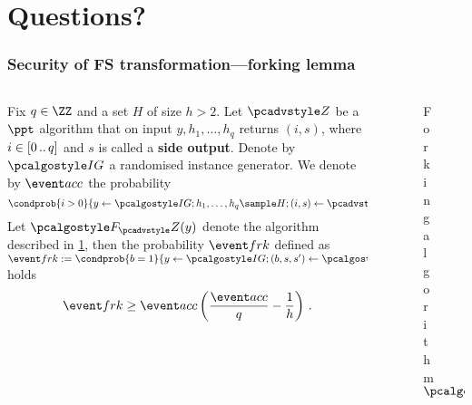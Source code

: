 \documentclass[aspectratio=169,handout]{beamer}
\renewcommand{\emph}[1]{\textbf{#1}}
\begin{document}
\section{Questions?}

\begin{frame}
  \frametitle{Security of FS transformation---forking lemma}
  \begin{lemma}
    \label{lem:forking_lemma}
    \begin{columns}
      \begin{column}{.5\linewidth}
        Fix $q \in \ZZ$ and a set $H$ of size $h > 2$. Let $\zdv$ be a $\ppt$
        algorithm that on input $y, h_1, \ldots, h_q$ returns $(i, s)$, where
        $i \in[0 \, .. \, q]$ and $s$ is called a \emph{side output}. Denote by
        $\ig$ a randomised instance generator. We denote by $\accProb$ the
        probability
        \[
          \condprob{i > 0}{y \gets \ig; h_1, \ldots, h_q \sample H; (i, s) \gets
            \zdv(y, h_1, \ldots, h_q)}\,.
        \]
        Let $\forking_\zdv(y)$ denote the algorithm described in
        \cref{fig:forking_lemma}, then the probability $\frkProb$ defined as
        $ \frkProb := \condprob{b = 1}{y \gets \ig; (b, s, s') \gets
          \forking_{\zdv}(y)} $ holds
        \[
          \frkProb \geq \accProb \brak{\frac{\accProb}{q} - \frac{1}{h}}\,.
        \]
      \end{column}
      \begin{column}{.4\linewidth}
	\begin{figure}
		\centering
		\caption{Forking algorithm $\forking_\zdv$}
		\label{fig:forking_lemma}
              \end{figure}
            \end{column}
            \end{columns}
\end{lemma}

\end{frame}
\end{document}
